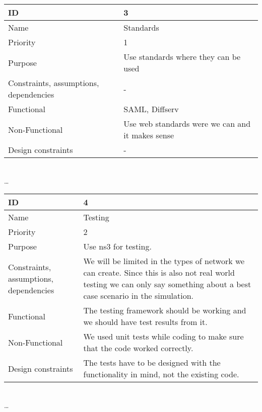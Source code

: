 \begin{center}
	\begin{tabular}{| p{4cm} | p{8cm} |}
		\hline
		ID & 3 \\
		\hline
		Name & Standards \\
		\hline
		Priority & 1 \\
		\hline
		Purpose & Use standards where they can be used \\
		\hline 
		Constraints, assumptions, dependencies & -\\
		\hline  
		Functional & SAML, Diffserv \\
		\hline
		Non-Functional & Use web standards were we can and it makes sense \\ 
		\hline
		Design constraints & - \\
		\hline
	\end{tabular}
	\\  \ldots  \\

	\begin{tabular}{| p{4cm} | p{8cm} |}
		\hline
		ID & 4 \\
		\hline
		Name & Testing  \\
		\hline
		Priority & 2 \\
		\hline
		Purpose & Use \gls{ns3} for testing. \\
		\hline 
		Constraints, assumptions, dependencies & We will be limited in the types of network we can create. Since this is also not real world testing we can only say something about a best case scenario in the simulation.\\
		\hline  
		Functional & The testing framework should be working and we should have test results from it.\\
		\hline
		Non-Functional & We used unit tests while coding to make sure that the code worked correctly. \\ 
		\hline
		Design constraints & The tests have to be designed with the functionality in mind, not the existing code. \\
		\hline
	\end{tabular}
	\\  \ldots  \\


\end{center}
